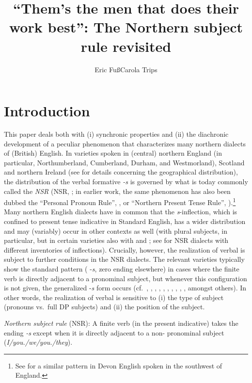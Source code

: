 \documentclass[output=paper]{langsci/langscibook}
\author{Eric Fuß\affiliation{Ruhr University Bochum}\lastand Carola Trips\affiliation{University of Mannheim}}
\title{“Them’s the men that does their work best”: The Northern subject rule revisited}
\begin{document}
\glsresetall

\section{Introduction}\label{sec:intro}

This paper deals both with (i) synchronic properties and (ii) the diachronic
development of a peculiar  phenomenon that characterizes many northern
dialects of (British) English. In varieties spoken in (central) northern
England (in particular, Northumberland, Cumberland, Durham, and Westmorland),
Scotland and northern Ireland (see \citealt{Pietsch:2005a,Pietsch:2005b} for
details concerning the geographical distribution), the distribution of the
verbal  formative \emph{-s} is governed by what is today commonly
called the \emph{\glsdesc{NSR}} (\gls{NSR},
\citealt[221]{Ihalainen:1994}; in earlier work, the same phenomenon has also
been dubbed the ``Personal Pronoun Rule'', \citealt{McIntosh:1988}, or ``Northern
Present Tense Rule'', \citealt{Montgomery:1994}).\footnote{See
\cite{GodfreyTagliamonte:1999} for a similar pattern in Devon English spoken in
the southwest of England.} Many northern English dialects have in common that
the \emph{s}-inflection, which is confined to \Tsg{} present tense indicative in
Standard English, has a wider distribution and may (variably) occur in other
contexts as well (with plural subjects, in particular, but in certain varieties
also with \Fsg{} and \Ssg{}; see \citealt{Pietsch:2005a,Pietsch:2005b} for \gls{NSR}
dialects with different inventories of inflections). Crucially, however, the
realization of verbal  is subject to further conditions in the \gls{NSR}
dialects. The relevant varieties typically show the standard  pattern
(\Tsg{} -\emph{s}, zero ending elsewhere) in cases where the finite verb is
directly adjacent to a pronominal subject, but whenever this configuration is
not given, the generalized -\emph{s} form occurs (cf.\ \citealt{Murray:1873},
\citealt{Berndt1956}, \citealt{McIntosh:1988}, \citealt{Montgomery:1994},
\citealt{Schendl:1996b}, \citealt{Corrigan:1997},
\citealt{Boerjarschapman:1998}, \citealt{Klemola:2000},
\citealt{Pietsch:2005a,Pietsch:2005b}, \citealt{deHaas:2011}, amongst others).
In other words, the realization of verbal  is sensitive to (i) the
type of subject (pronouns vs.\ full DP subjects) and (ii) the position of the
subject.

\ea \textit{Northern subject rule} (\gls{NSR}): A finite verb
  (in the present indicative) takes the ending \emph{-s} except when it is
  directly adjacent to a non-\Tsg{} pronominal subject
  (\emph{I/you.\Sg/we/you.\Pl/they}).
\z
\end{document}
